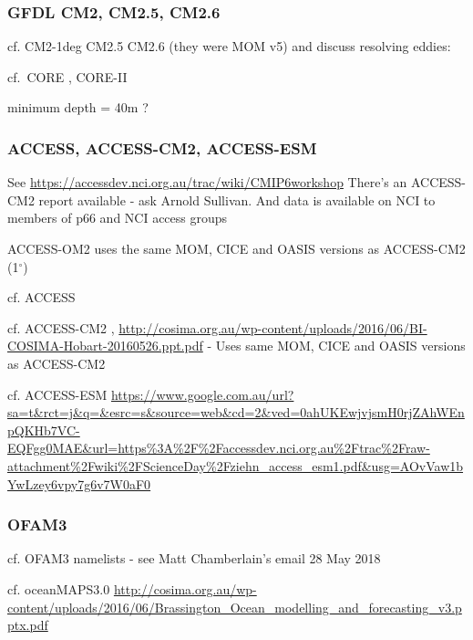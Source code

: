\documentclass[11pt]{article}
\begin{document}
\subsubsection{GFDL CM2, CM2.5, CM2.6}
cf. CM2-1deg CM2.5 CM2.6 (they were MOM v5) and discuss resolving eddies: \citet{GriffiesWintonAndersonBensonDelworthDufourDunneGoddardMorrison2015a}
\citet{DelworthRosatiAndersonAdcroftBalajiBensonDixonGriffiesLee2012a}
\citet{DunneJohnAdcroftGriffiesHallbergShevliakovaStoufferCookeDunne2012a}
\citet{Griffies2015a}

cf.\ CORE \citep{GriffiesBiastochBoningBryanDanabasogluChassignetEnglandGerdesHaak2009a}, CORE-II \citep{DanabasogluYeagerBaileyBehrensBentsenBiBiastochBoningBozec2014a}

minimum depth = 40m ?

\subsubsection{ACCESS, ACCESS-CM2, ACCESS-ESM}
See \url{https://accessdev.nci.org.au/trac/wiki/CMIP6workshop}
There's an ACCESS-CM2 report available - ask Arnold Sullivan.
And data is available on NCI to members of p66 and NCI access groups

ACCESS-OM2 uses the same MOM, CICE and OASIS versions as ACCESS-CM2 (1$^\circ$)

cf. ACCESS \citet{BiDixMarslandOFarrellRashidUotilaHirstKowalczykGolebiewski2013a, BiMarslandUotilaOFarrellFiedlerSullivanGriffiesZhouHirst2013a, DixVohralikBiRashidMarslandOFarrellUotilaHirstKowalczyk2013a}

\citet{BiMarslandUotilaOFarrellFiedlerSullivanGriffiesZhouHirst2013a}

cf. ACCESS-CM2 \citet{BiYanSullivan2016a}, \url{http://cosima.org.au/wp-content/uploads/2016/06/BI-COSIMA-Hobart-20160526.ppt.pdf} - Uses same MOM, CICE and OASIS versions as ACCESS-CM2

cf. ACCESS-ESM \url{https://www.google.com.au/url?sa=t&rct=j&q=&esrc=s&source=web&cd=2&ved=0ahUKEwjvjsmH0rjZAhWEnpQKHb7VC-EQFgg0MAE&url=https%3A%2F%2Faccessdev.nci.org.au%2Ftrac%2Fraw-attachment%2Fwiki%2FScienceDay%2Fziehn_access_esm1.pdf&usg=AOvVaw1bYwLzey6vpy7g6v7W0aF0}

\subsubsection{OFAM3}
cf. OFAM3 namelists - see Matt Chamberlain's email 28 May 2018

cf. oceanMAPS3.0  \url{http://cosima.org.au/wp-content/uploads/2016/06/Brassington_Ocean_modelling_and_forecasting_v3.pptx.pdf} %
\end{document}
